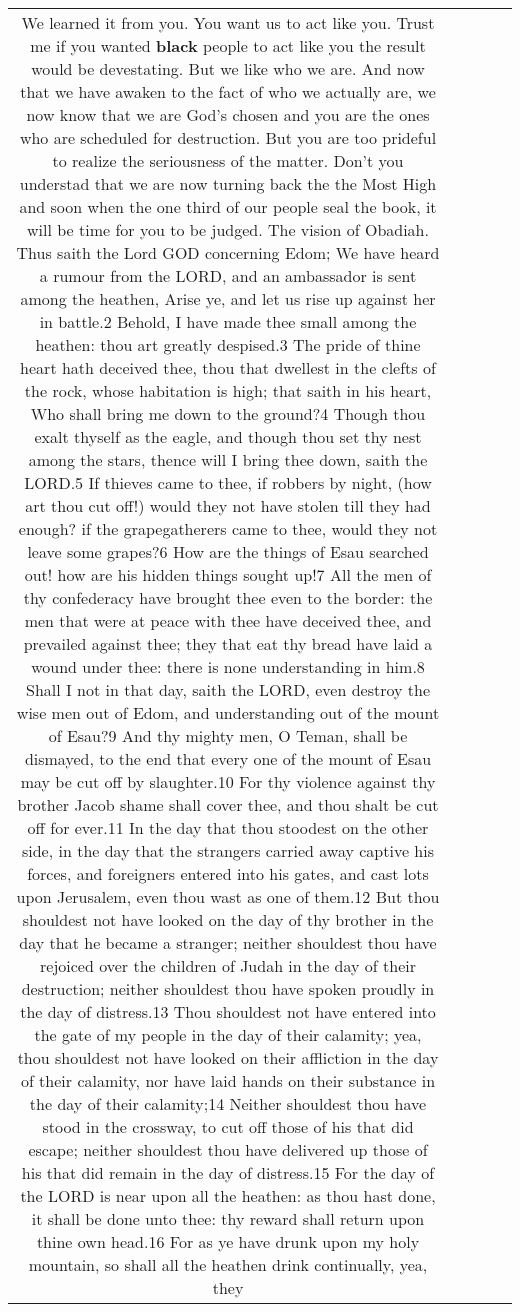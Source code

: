 \documentclass[11pt]{article}
\newlength\mylength
\begin{document}
\begin{center}
\begin{longtable}{|C{.65\mylength}|C{.30\mylength}|C{.12\mylength}|C{.12\mylength}|C{.12\mylength}|}
  \small We learned it from you.  You want us to act like you.  Trust me if you wanted \textbf{black} people to act like you the result would be devestating.  But we like who we are.  And now that we have awaken to the fact of who we actually are, we now know that we are God's chosen and you are the ones who are scheduled for destruction.  But you are too prideful to realize the seriousness of the matter.  Don't you understad that we are now turning back the the Most High and soon when the one third of our people seal the book, it will be time for you to be judged.  The vision of Obadiah. Thus saith the Lord GOD concerning Edom; We have heard a rumour from the LORD, and an ambassador is sent among the heathen, Arise ye, and let us rise up against her in battle.2 Behold, I have made thee small among the heathen: thou art greatly despised.3 The pride of thine heart hath deceived thee, thou that dwellest in the clefts of the rock, whose habitation is high; that saith in his heart, Who shall bring me down to the ground?4 Though thou exalt thyself as the eagle, and though thou set thy nest among the stars, thence will I bring thee down, saith the LORD.5 If thieves came to thee, if robbers by night, (how art thou cut off!) would they not have stolen till they had enough? if the grapegatherers came to thee, would they not leave some grapes?6 How are the things of Esau searched out! how are his hidden things sought up!7 All the men of thy confederacy have brought thee even to the border: the men that were at peace with thee have deceived thee, and prevailed against thee; they that eat thy bread have laid a wound under thee: there is none understanding in him.8 Shall I not in that day, saith the LORD, even destroy the wise men out of Edom, and understanding out of the mount of Esau?9 And thy mighty men, O Teman, shall be dismayed, to the end that every one of the mount of Esau may be cut off by slaughter.10 For thy violence against thy brother Jacob shame shall cover thee, and thou shalt be cut off for ever.11 In the day that thou stoodest on the other side, in the day that the strangers carried away captive his forces, and foreigners entered into his gates, and cast lots upon Jerusalem, even thou wast as one of them.12 But thou shouldest not have looked on the day of thy brother in the day that he became a stranger; neither shouldest thou have rejoiced over the children of Judah in the day of their destruction; neither shouldest thou have spoken proudly in the day of distress.13 Thou shouldest not have entered into the gate of my people in the day of their calamity; yea, thou shouldest not have looked on their affliction in the day of their calamity, nor have laid hands on their substance in the day of their calamity;14 Neither shouldest thou have stood in the crossway, to cut off those of his that did escape; neither shouldest thou have delivered up those of his that did remain in the day of distress.15 For the day of the LORD is near upon all the heathen: as thou hast done, it shall be done unto thee: thy reward shall return upon thine own head.16 For as ye have drunk upon my holy mountain, so shall all the heathen drink continually, yea, they 
\end{longtable}
\end{center}
\end{document}
